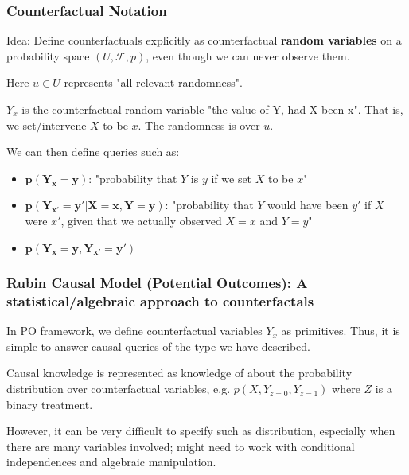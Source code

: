 \documentclass[handout]{beamer}
\begin{document}
\begin{frame}
\frametitle{Counterfactual Notation}
Idea: Define counterfactuals explicitly as counterfactual \textbf{random variables} on a probability space $(U, \mathcal{F}, p)$, even though we can never observe them.

\medskip
Here $u \in U$ represents "all relevant randomness".

\pause
\bigskip
$Y_x$ is the counterfactual random variable "the value of Y, had X been x". That is, we set/intervene $X$ to be $x$. The randomness is over $u$.

\pause
\bigskip
We can then define queries such as:
\begin{itemize} 
    \item $\pmb{p(Y_{x} = y)}$: "probability that $Y$ is $y$ if we set $X$ to be $x$"
    \pause
	\item $\pmb{p(Y_{x'} = y' | X = x, Y = y)}$: "probability that $Y$ would have been $y'$ if $X$ were $x'$, given that we actually observed $X=x$ and $Y=y$"
	\pause
	\item $\pmb{p(Y_x = y, Y_{x'} = y')}$
\end{itemize}




\end{frame}

\begin{frame}
\frametitle{Rubin Causal Model (Potential Outcomes): A statistical/algebraic approach to counterfactals}

In PO framework, we define counterfactual variables $Y_x$ as primitives. Thus, it is simple to answer causal queries of the type we have described.
\pause

\bigskip
Causal knowledge is represented as knowledge of about the probability distribution over counterfactual variables, e.g. $p(X, Y_{z=0}, Y_{z=1})$ where $Z$ is a binary treatment.
\pause

\bigskip
However, it can be very difficult to specify such as distribution, especially when there are many variables involved; might need to work with conditional independences and algebraic manipulation.

\end{frame}
\end{document}

